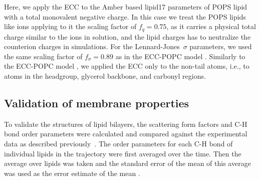 \documentclass[journal=jpcbfk,manuscript=article]{achemso}
\begin{document}
Here, we apply the ECC to the Amber based lipid17 parameters \cite{lipid17-future} of POPS lipid with
a total monovalent negative charge. 
In this case we treat the POPS lipids like ions
applying to it the scaling factor of $f_q = 0.75$,
as it carries a physical total charge similar to the ions in solution, 
and the lipid charges has to neutralize the counterion charges in simulations.
For the Lennard-Jones~$\sigma$ parameters, we used the same scaling factor of $f_\sigma = 0.89$
as in the ECC-POPC model \cite{melcr18}.
Similarly to the ECC-POPC model \cite{melcr18}, we applied the ECC only to the
non-tail atoms, i.e., to atoms in the headgroup, glycerol backbone, and carbonyl regions. 





 
 

\subsection{Validation of membrane properties} 

To validate the structures of lipid bilayers, the scattering form factors and C-H bond order parameters
were calculated and compared against the experimental data as described previously~\cite{botan15,ollila16,melcr18,nmrlipids_proj4}.
The order parameters for each C-H bond of individual lipids in the trajectory were first averaged
over the time. Then the average over lipids was taken and the standard error of the mean of this
average was used as the error estimate of the mean \cite{botan15,ollila16,nmrlipids_proj4}.
\end{document}
